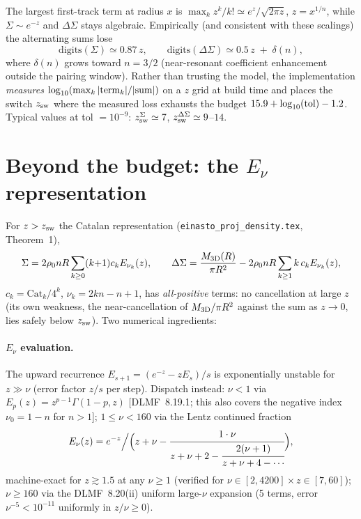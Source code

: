 \documentclass{article}
\begin{document}
The largest first-track term at radius $x$ is $\max_k z^k/k! \simeq
e^{z}/\sqrt{2\pi z}$, $z=x^{1/n}$, while $\Sigma\sim e^{-z}$ and
$\Delta\Sigma$ stays algebraic. Empirically (and consistent with these
scalings) the alternating sums lose
\begin{equation}
\text{digits}(\Sigma) \simeq 0.87\,z, \qquad
\text{digits}(\Delta\Sigma) \simeq 0.5\,z\;+\;\delta(n),
\end{equation}
where $\delta(n)$ grows toward $n=3/2$ (near-resonant coefficient
enhancement outside the pairing window). Rather than trusting the model, the
implementation \emph{measures} $\log_{10}(\max_k|{\rm term}_k| / |{\rm
sum}|)$ on a $z$ grid at build time and places the switch $z_{\rm sw}$ where
the measured loss exhausts the budget $15.9 + \log_{10}({\rm tol}) - 1.2$.
Typical values at tol $=10^{-9}$: $z_{\rm sw}^{\Sigma}\simeq7$,
$z_{\rm sw}^{\Delta\Sigma}\simeq9$--$14$.

\section{Beyond the budget: the $E_\nu$ representation}\label{sec:enu}

For $z>z_{\rm sw}$ the Catalan representation
(\texttt{einasto\_proj\_density.tex}, Theorem~1),
\begin{equation}
\Sigma = 2\rho_0 n R \sum_{k\ge0}(k{+}1)c_k E_{\nu_k}(z),\qquad
\Delta\Sigma = \frac{M_{\rm 3D}(R)}{\pi R^2}
- 2\rho_0 n R \sum_{k\ge1} k\,c_k E_{\nu_k}(z),
\end{equation}
$c_k = \mathrm{Cat}_k/4^k$, $\nu_k = 2kn-n+1$, has \emph{all-positive}
terms: no cancellation at large $z$ (its own weakness, the near-cancellation
of $M_{\rm 3D}/\pi R^2$ against the sum as $z\to0$, lies safely below
$z_{\rm sw}$). Two numerical ingredients:

\paragraph{$E_\nu$ evaluation.} The upward recurrence
$E_{s+1}=(e^{-z}-zE_s)/s$ is exponentially unstable for $z\gg\nu$ (error
factor $z/s$ per step). Dispatch instead: $\nu<1$ via
$E_p(z)=z^{p-1}\Gamma(1-p,z)$ [DLMF~8.19.1; this also covers the negative
index $\nu_0=1-n$ for $n>1$]; $1\le\nu<160$ via the Lentz continued
fraction
\begin{equation}
E_\nu(z) = e^{-z}\Big/\Big(z+\nu-\cfrac{1\cdot\nu}{z+\nu+2-
\cfrac{2(\nu+1)}{z+\nu+4-\cdots}}\Big),
\end{equation}
machine-exact for $z\gtrsim1.5$ at any $\nu\ge1$ (verified for
$\nu\in[2,4200]\times z\in[7,60]$); $\nu\ge160$ via the DLMF~8.20(ii)
uniform large-$\nu$ expansion (5 terms, error $\nu^{-5}<10^{-11}$ uniformly
in $z/\nu\ge0$).
\end{document}
